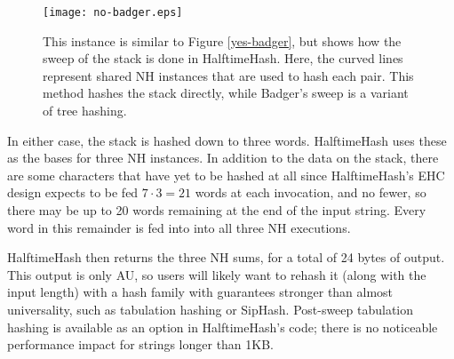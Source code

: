 \documentclass[runningheads]{llncs}
\begin{document}
\begin{figure}
\texttt{[image: no-badger.eps]}
\caption{\label{no-badger}
  This instance is similar to Figure \ref{yes-badger}, but shows how the sweep of the stack is done in HalftimeHash.
  Here, the curved lines represent shared NH instances that are used to hash each pair.
  This method hashes the stack directly, while Badger's sweep is a variant of tree hashing.
}
\end{figure}

In either case, the stack is hashed down to three words.
HalftimeHash uses these as the bases for three NH instances.
In addition to the data on the stack, there are some characters that have yet to be hashed at all since HalftimeHash's EHC design expects to be fed $7 \cdot 3 = 21$ words at each invocation, and no fewer, so there may be up to 20 words remaining at the end of the input string.
Every word in this remainder is fed into into all three NH executions.

HalftimeHash then returns the three NH sums, for a total of 24 bytes of output.
This output is only AU, so users will likely want to rehash it (along with the input length) with a hash family with guarantees stronger than almost universality, such as tabulation hashing or SipHash. \cite{tabulation,siphash}
Post-sweep tabulation hashing is available as an option in HalftimeHash's code; there is no noticeable performance impact for strings longer than 1KB.





\end{document}
